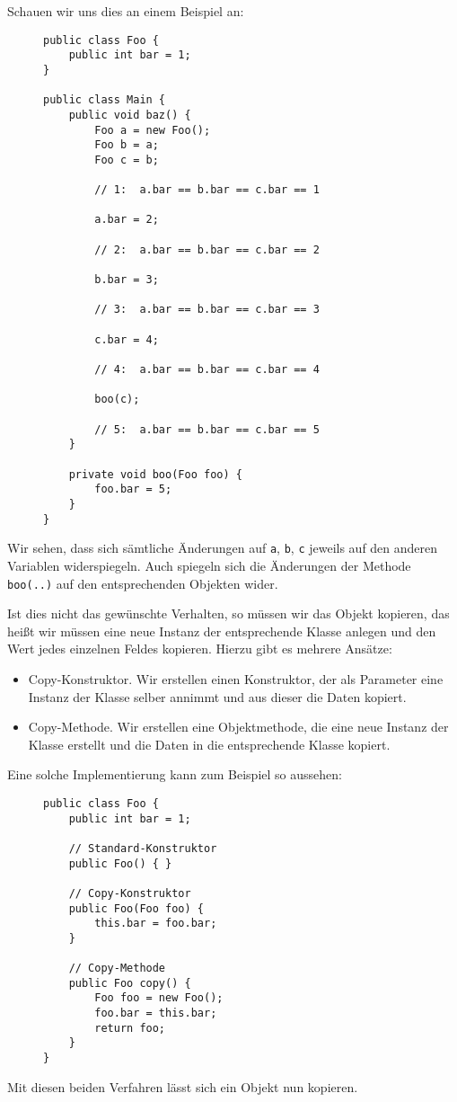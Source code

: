 		Schauen wir uns dies an einem Beispiel an:
		\begin{figure}[H]
			\centering
			\begin{lstlisting}
public class Foo {
	public int bar = 1;
}

public class Main {
	public void baz() {
		Foo a = new Foo();
		Foo b = a;
		Foo c = b;

		// 1:  a.bar == b.bar == c.bar == 1

		a.bar = 2;

		// 2:  a.bar == b.bar == c.bar == 2

		b.bar = 3;

		// 3:  a.bar == b.bar == c.bar == 3

		c.bar = 4;

		// 4:  a.bar == b.bar == c.bar == 4

		boo(c);

		// 5:  a.bar == b.bar == c.bar == 5
	}

	private void boo(Foo foo) {
		foo.bar = 5;
	}
}
\end{lstlisting}
		\end{figure}
		Wir sehen, dass sich sämtliche Änderungen auf \lstinline|a|, \lstinline|b|, \lstinline|c| jeweils auf den anderen Variablen widerspiegeln. Auch spiegeln sich die Änderungen der Methode \lstinline|boo(..)| auf den entsprechenden Objekten wider.
		
		Ist dies nicht das gewünschte Verhalten, so müssen wir das Objekt kopieren, das heißt wir müssen eine neue Instanz der entsprechende Klasse anlegen und den Wert jedes einzelnen Feldes kopieren. Hierzu gibt es mehrere Ansätze:
		\begin{itemize}
			\item Copy-Konstruktor. Wir erstellen einen Konstruktor, der als Parameter eine Instanz der Klasse selber annimmt und aus dieser die Daten kopiert.
			\item Copy-Methode. Wir erstellen eine Objektmethode, die eine neue Instanz der Klasse erstellt und die Daten in die entsprechende Klasse kopiert.
		\end{itemize}
		Eine solche Implementierung kann zum Beispiel so aussehen:
		\begin{figure}[H]
			\centering
			\begin{lstlisting}
public class Foo {
	public int bar = 1;

	// Standard-Konstruktor
	public Foo() { }

	// Copy-Konstruktor
	public Foo(Foo foo) {
		this.bar = foo.bar;
	}

	// Copy-Methode
	public Foo copy() {
		Foo foo = new Foo();
		foo.bar = this.bar;
		return foo;
	}
}
\end{lstlisting}
		\end{figure}
		Mit diesen beiden Verfahren lässt sich ein Objekt nun kopieren.
	
